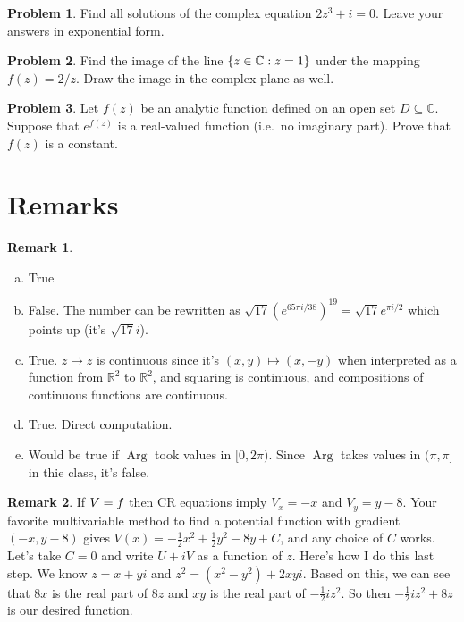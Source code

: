 \documentclass[11pt,oneside]{amsart}
\theoremstyle{definition}
\newtheorem{problem}{Problem}
\newtheorem{remark}{Remark}
\newcommand{\bC}{\mathbb{C}}
\newcommand{\bR}{\mathbb{R}}
\let\Im\relax
\DeclareMathOperator{\Im}{Im}
\DeclareMathOperator{\Arg}{Arg}
\begin{document}
\begin{problem}
  Find all solutions of the complex equation $2z^3+i=0$. Leave your answers in exponential form.
\end{problem}

\begin{problem}
  Find the image of the line $\{z\in\bC:\Im z=1\}$ under the mapping $f(z)=2/z$. Draw the image in the complex plane as well.
\end{problem}

\begin{problem}
  Let $f(z)$ be an analytic function defined on an open set $D\subseteq\bC$. Suppose that $e^{f(z)}$ is a real-valued function (i.e.\ no imaginary part). Prove that $f(z)$ is a constant.
\end{problem}

\newpage

\section{Remarks}
\begin{remark}
  \leavevmode\begin{enumerate}[(a)]
    \item True
    \item False. The number can be rewritten as $\sqrt{17}(e^{65\pi i/38})^{19}=\sqrt{17}e^{\pi i/2}$ which points up (it's $\sqrt{17}i$).
    \item True. $z\mapsto \overline z$ is continuous since it's $(x,y)\mapsto (x,-y)$ when interpreted as a function from $\bR^2$ to $\bR^2$, and squaring is continuous, and compositions of continuous functions are continuous.
    \item True. Direct computation.
    \item Would be true if $\Arg$ took values in $[0,2\pi)$. Since $\Arg$ takes values in $(\pi,\pi]$ in thie class, it's false.
  \end{enumerate}
\end{remark}

\begin{remark}
  If $V=\Im f$ then CR equations imply $V_x=-x$ and $V_y=y-8$. Your favorite multivariable method to find a potential function with gradient $(-x,y-8)$ gives $V(x)=-\frac 12x^2+\frac 12y^2-8y+C$, and any choice of $C$ works. Let's take $C=0$ and write $U+iV$ as a function of $z$. Here's how I do this last step. We know $z=x+yi$ and $z^2=(x^2-y^2)+2xyi$. Based on this, we can see that $8x$ is the real part of $8z$ and $xy$ is the real part of $-\frac 12iz^2$. So then $-\frac12iz^2+8z$ is our desired function.
\end{remark}
\end{document}
